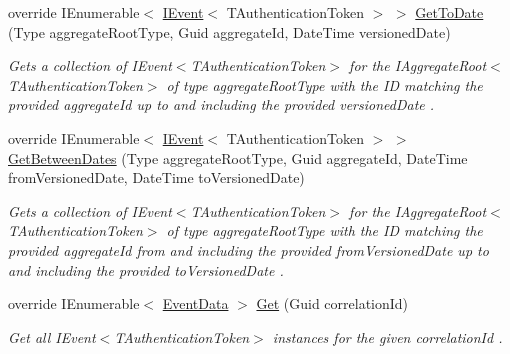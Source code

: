 \begin{DoxyCompactItemize}
override I\+Enumerable$<$ \hyperlink{interfaceCqrs_1_1Events_1_1IEvent}{I\+Event}$<$ T\+Authentication\+Token $>$ $>$ \hyperlink{classCqrs_1_1MongoDB_1_1Events_1_1MongoDbEventStore_aaf78eb481e17c4a7dee0efca8a4d47bf_aaf78eb481e17c4a7dee0efca8a4d47bf}{Get\+To\+Date} (Type aggregate\+Root\+Type, Guid aggregate\+Id, Date\+Time versioned\+Date)
\begin{DoxyCompactList}\small\item\em Gets a collection of I\+Event$<$\+T\+Authentication\+Token$>$ for the I\+Aggregate\+Root$<$\+T\+Authentication\+Token$>$ of type {\itshape aggregate\+Root\+Type}  with the ID matching the provided {\itshape aggregate\+Id}  up to and including the provided {\itshape versioned\+Date} . \end{DoxyCompactList}\item 
override I\+Enumerable$<$ \hyperlink{interfaceCqrs_1_1Events_1_1IEvent}{I\+Event}$<$ T\+Authentication\+Token $>$ $>$ \hyperlink{classCqrs_1_1MongoDB_1_1Events_1_1MongoDbEventStore_a95637f6bebb94d505a6b3020275cfdf9_a95637f6bebb94d505a6b3020275cfdf9}{Get\+Between\+Dates} (Type aggregate\+Root\+Type, Guid aggregate\+Id, Date\+Time from\+Versioned\+Date, Date\+Time to\+Versioned\+Date)
\begin{DoxyCompactList}\small\item\em Gets a collection of I\+Event$<$\+T\+Authentication\+Token$>$ for the I\+Aggregate\+Root$<$\+T\+Authentication\+Token$>$ of type {\itshape aggregate\+Root\+Type}  with the ID matching the provided {\itshape aggregate\+Id}  from and including the provided {\itshape from\+Versioned\+Date}  up to and including the provided {\itshape to\+Versioned\+Date} . \end{DoxyCompactList}\item 
override I\+Enumerable$<$ \hyperlink{classCqrs_1_1Events_1_1EventData}{Event\+Data} $>$ \hyperlink{classCqrs_1_1MongoDB_1_1Events_1_1MongoDbEventStore_ac886ca0a57ad86cb99ef0a3767db9280_ac886ca0a57ad86cb99ef0a3767db9280}{Get} (Guid correlation\+Id)
\begin{DoxyCompactList}\small\item\em Get all I\+Event$<$\+T\+Authentication\+Token$>$ instances for the given {\itshape correlation\+Id} . \end{DoxyCompactList}\end{DoxyCompactItemize}
